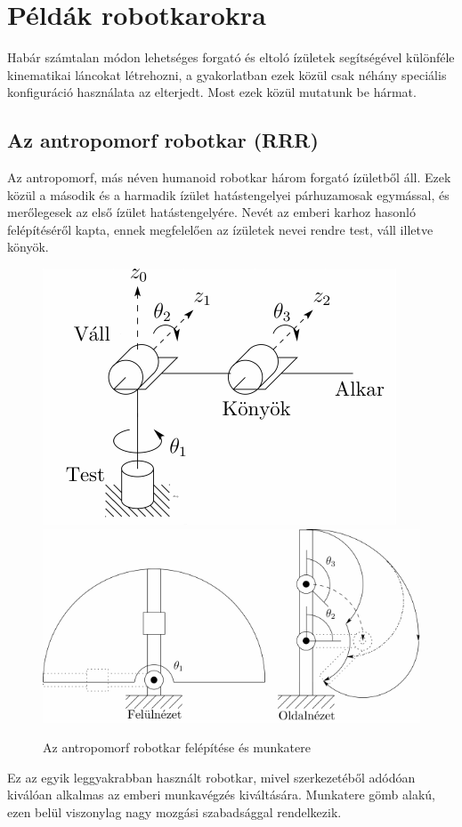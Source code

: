\documentclass[12pt,a4paper]{report}
\theoremstyle{remark}
\theoremstyle{definition}
\begin{document}
\section{Példák robotkarokra}
Habár számtalan módon lehetséges forgató és eltoló ízületek segítségével különféle kinematikai láncokat létrehozni, 
a gyakorlatban ezek közül csak néhány speciális konfiguráció használata az elterjedt. Most ezek közül mutatunk be 
hármat.

\subsection{Az antropomorf robotkar (RRR)}
Az antropomorf, más néven humanoid robotkar három forgató ízületből áll. Ezek közül a második és a harmadik ízület 
hatástengelyei párhuzamosak egymással, és merőlegesek az első ízület hatástengelyére. Nevét az emberi karhoz hasonló 
felépítéséről kapta, ennek megfelelően az ízületek nevei rendre test, váll illetve könyök.
\begin{figure}[h]
\centering
\includegraphics[width=0.3\linewidth]{./images/Elbow_manipulator}\hspace{1cm}
\includegraphics[width=0.5\linewidth]{./images/Elbow_workspace}
\caption{Az antropomorf robotkar felépítése és munkatere}
\end{figure}

Ez az egyik leggyakrabban használt robotkar, mivel szerkezetéből adódóan kiválóan alkalmas az emberi munkavégzés 
kiváltására. Munkatere gömb alakú, ezen belül viszonylag nagy mozgási szabadsággal rendelkezik.
\end{document}
